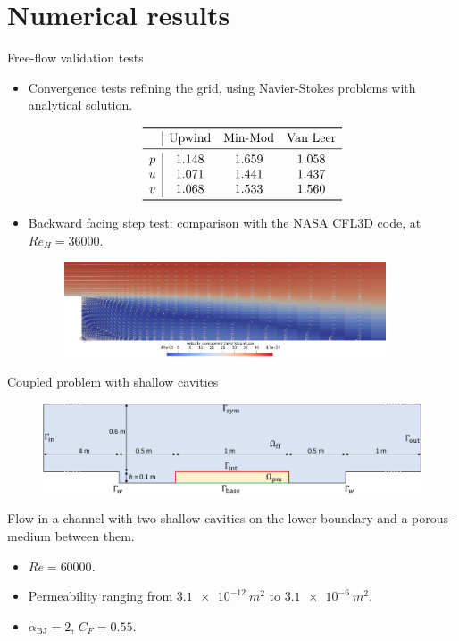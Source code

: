 \documentclass{beamer}
\begin{document}
\section{Numerical results}
\begin{frame}{Free-flow validation tests}
\begin{itemize}
	\item Convergence tests refining the grid, using Navier-Stokes problems 
	with analytical solution.
	\vspace{-0.3cm}
	\begin{table}\scriptsize
		\[
		\begin{array}{c|ccc}
		\toprule
		& \text{Upwind} & \text{Min-Mod} & \text{Van Leer} \\ 
		\midrule
		p & 1.148 & 1.659 & 1.058\\
		u & 1.071 & 1.441 & 1.437\\
		v & 1.068 & 1.533 & 1.560\\
		\bottomrule
		\end{array}
		\]
	\end{table}
	\item Backward facing step test: comparison with the NASA CFL3D code, at 
	$Re_H=36000$.
	\begin{figure}
		\centering
		\includegraphics[width=0.9\textwidth]{bfs_glimphs.png}
	\end{figure}
\end{itemize}
\end{frame}
\begin{frame}{Coupled problem with shallow cavities}
\begin{figure}
	\centering
	\includegraphics[width=\textwidth]{cavities_multidomain_slides.pdf}
\end{figure}
Flow in a channel with two shallow cavities on the lower boundary and a porous-medium 
between them.
\begin{itemize}
	\item $Re=60000$.
	\item Permeability ranging from $\SI{3.1e-12}{m^2}$ to $\SI{3.1e-6}{m^2}$.
	\item $\alpha_\text{BJ} = 2$, $C_F=0.55$.
\end{itemize}
\end{frame}
\end{document}
